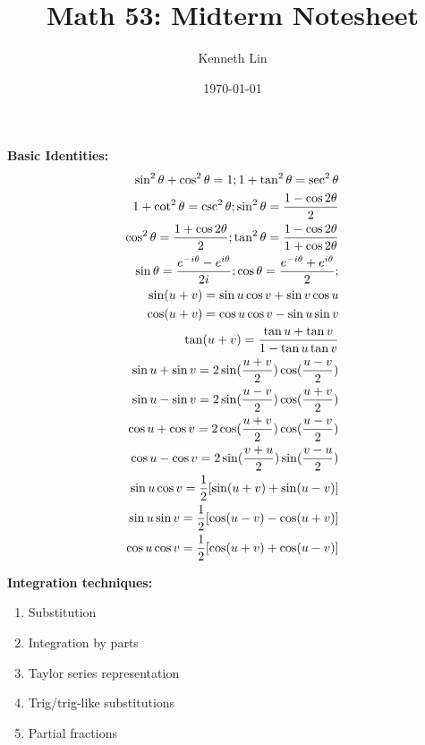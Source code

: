 \documentclass[twoside,draft]{article}
\begin{document}
\title{Math 53: Midterm Notesheet}
\author{Kenneth Lin}
\date{\today}

\begin{multicols}{3}

  \textbf{Basic Identities:}
  \begin{align*}
    \sin^2\theta + \cos^2\theta = 1;
    1 + \tan^2\theta = \sec^2\theta \\
    1 + \cot^2\theta = \csc^2\theta;
    \sin^2\theta = \frac{1-\cos2\theta}{2} \\
    \cos^2\theta = \frac{1+\cos2\theta}{2};
    \tan^2\theta = \frac{1-\cos2\theta}{1+\cos2\theta} \\
    \sin \theta = \frac{e^{-i\theta}-e^{i\theta}}{2i};
    \cos \theta = \frac{e^{-i\theta}+e^{i\theta}}{2}; \\
    \sin(u+v) = \sin u \cos v + \sin v \cos u \\
    \cos(u+v) = \cos u \cos v - \sin u \sin v \\
    \tan(u+v) = \frac{\tan u + \tan v}{1 - \tan u \tan v} \\
    \sin u + \sin v = 2 \sin ({u+v \over 2}) \cos ({u-v \over 2}) \\
    \sin u - \sin v = 2 \sin ({u-v \over 2}) \cos ({u+v \over 2}) \\
    \cos u + \cos v = 2 \cos ({u+v \over 2}) \cos ({u-v \over 2}) \\
    \cos u - \cos v = 2 \sin ({v+u \over 2}) \sin ({v-u \over 2}) \\
    \sin u \cos v = {1 \over 2}[\sin(u+v) + \sin(u-v)] \\
    \sin u \sin v = {1 \over 2}[\cos(u-v) - \cos(u+v)] \\
    \cos u \cos v = {1 \over 2}[\cos(u+v) + \cos(u-v)]
  \end{align*}

  \textbf{Integration techniques:}
  \begin{enumerate}
  \item Substitution
  \item Integration by parts
  \item Taylor series representation
  \item Trig/trig-like substitutions
  \item Partial fractions
  \end{enumerate}


\end{multicols}
\end{document}
